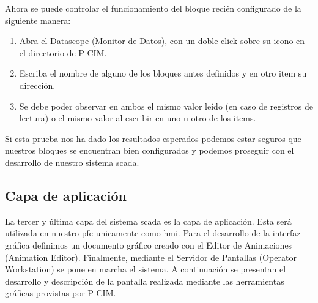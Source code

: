 Ahora se puede controlar el funcionamiento del bloque recién configurado de la 
siguiente manera:
\begin{enumerate}
  \item Abra el Datascope (Monitor de Datos), con un doble click sobre su icono 
  en el directorio de P-CIM.
  \item Escriba el nombre de alguno de los bloques antes definidos  y en otro 
  item su dirección.
  \item Se debe poder observar en ambos el mismo valor leído (en caso de
  registros de lectura) o el mismo valor al escribir en uno u otro de los items.
\end{enumerate}
Si esta prueba nos ha dado los resultados esperados podemos estar seguros que 
nuestros bloques se encuentran bien configurados y podemos proseguir con el 
desarrollo de nuestro sistema \gls{scada}.


\subsection{Capa de aplicación}
\label{subsec:CapaAplicacion}
La tercer y última capa del sistema \gls{scada} es la capa de aplicación. Esta 
será utilizada en nuestro \gls{pfe} unicamente como \gls{hmi}. Para el 
desarrollo de la interfaz gráfica definimos un documento gráfico creado con el 
Editor de Animaciones (Animation Editor). Finalmente, mediante el Servidor de 
Pantallas (Operator Workstation) se pone en marcha el sistema. A continuación se 
presentan el desarrollo y descripción de la pantalla realizada mediante las 
herramientas gráficas provistas por P-CIM.



